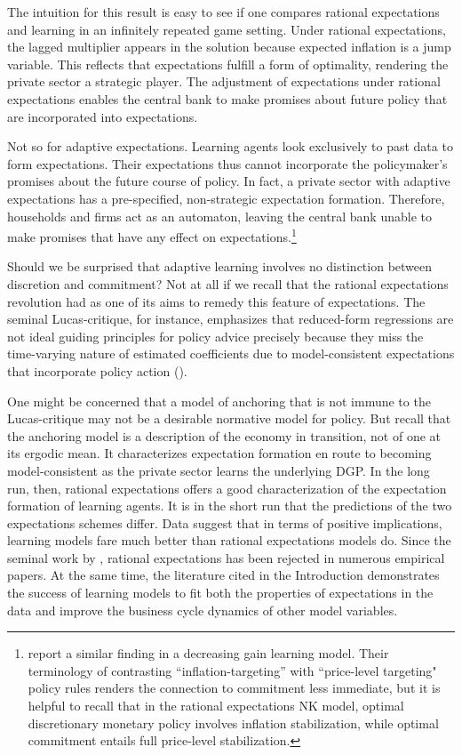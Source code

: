 \documentclass[11pt]{article}
\renewcommand{\[}{\begin{equation}}
\renewcommand{\]}{\end{equation}}
\begin{document}
The intuition for this result is easy to see if one compares rational expectations and learning in an infinitely repeated game setting. Under rational expectations, the lagged multiplier appears in the solution because expected inflation is a jump variable. This reflects that expectations fulfill a form of optimality, rendering the private sector a strategic player. The adjustment of expectations under rational expectations enables the central bank to make promises about future policy that are incorporated into expectations. 

Not so for adaptive expectations. Learning agents look exclusively to past data to form expectations. Their expectations thus cannot incorporate the policymaker's promises about the future course of policy. In fact, a private sector with adaptive expectations has a pre-specified, non-strategic expectation formation. Therefore, households and firms act as an automaton, leaving the central bank unable to make promises that have any effect on expectations.\footnote{\cite{mele2019perils} report a similar finding in a decreasing gain learning model. Their terminology of contrasting ``inflation-targeting'' with ``price-level targeting" policy rules renders the connection to commitment less immediate, but it is helpful to recall that in the rational expectations NK model, optimal discretionary monetary policy involves inflation stabilization, while optimal commitment entails full price-level stabilization.}

Should we be surprised that adaptive learning involves no distinction between discretion and commitment? Not at all if we recall that the rational expectations revolution had as one of its aims to remedy this feature of expectations. The seminal Lucas-critique, for instance, emphasizes that reduced-form regressions are not ideal guiding principles for policy advice precisely because they miss the time-varying nature of estimated coefficients due to model-consistent expectations that incorporate policy action (\cite{lucas1976econometric}).

One might be concerned that a model of anchoring that is not immune to the Lucas-critique may not be a desirable normative model for policy. But recall that the anchoring model is a description of the economy in transition, not of one at its ergodic mean. It characterizes expectation formation en route to becoming model-consistent as the private sector learns the underlying DGP. In the long run, then, rational expectations offers a good characterization of the expectation formation of learning agents. It is in the short run that the predictions of the two expectations schemes differ. Data suggest that in terms of positive implications, learning models fare much better than rational expectations models do. Since the seminal work by \cite{coibion2015information}, rational expectations has been rejected in numerous empirical papers. At the same time, the literature cited in the Introduction demonstrates the success of learning models to fit both the properties of expectations in the data and improve the business cycle dynamics of other model variables. 
\end{document}

